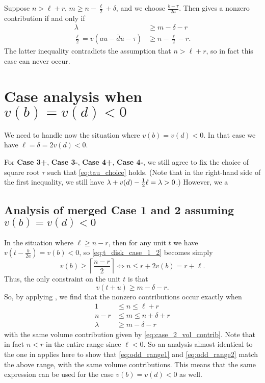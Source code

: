 \begin{description}
Suppose $n > \ell + r$,
$m \ge n - \frac{\ell}{2} + \delta$, and we choose $\frac{b-\tau}{2a}$.
Then  gives a nonzero contribution if and only if
\begin{align*}
  \lambda &\geq m - \delta - r \\
  \frac{\ell}{2} = v(au-\bar d \bar u - \tau) & \geq n - \frac{\ell}{2} - r.
\end{align*}
The latter inequality contradicts the assumption that $n > \ell + r$,
so in fact this case can never occur.
\end{description}

\section{Case analysis when $v(b) = v(d) < 0$}
We need to handle now the situation where $v(b) = v(d) < 0$.
In that case we have $\ell = \delta = 2v(d) < 0$.

For \textbf{Case 3\ts+}, \textbf{Case 3\ts-}, \textbf{Case 4\ts+}, \textbf{Case 4\ts-},
we still agree to fix the choice of square root $\tau$ such that
\eqref{eq:tau_choice} holds.
(Note that in the right-hand side of the first inequality,
we still have $\lambda + v(d) - \frac{1}{2} \ell = \lambda > 0$.)
However, we a

\subsection{Analysis of merged Case 1 and 2 assuming $v(b) = v(d) < 0$}
In the situation where $\ell \ge n - r$,
then for any unit $t$ we have $v(t-\frac{b}{2a}) = v(b) < 0$,
so \eqref{eq:t_disk_case_1_2} becomes simply
\[ v(b) \ge \left\lceil \frac{n-r}{2} \right\rceil \iff n \le r + 2 v(b) = r + \ell. \]
Thus, the only constraint on the unit $t$ is that
\[ v(t + u) \ge m - \delta - r. \]
So, by applying , we find that the nonzero contributions occur exactly when
\begin{align*}
  1 &\le n \le \ell + r \\
  n-r &\le m \le n + \delta + r \\
  \lambda &\ge m - \delta - r
\end{align*}
with the same volume contribution given by \eqref{eq:case_2_vol_contrib}.
Note that in fact $n < r$ in the entire range since $\ell < 0$.
So an analysis almost identical to the one in  applies here
to show that \eqref{eq:odd_range1} and \eqref{eq:odd_range2}
match the above range, with the same volume contributions.
This means that the same expression can be used for the case $v(b) = v(d) < 0$ as well.

